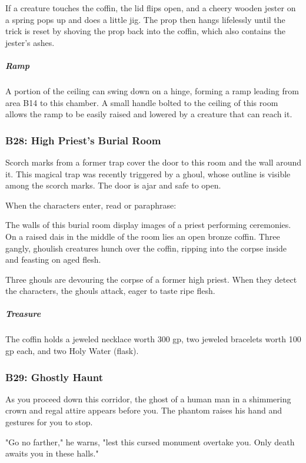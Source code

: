 \documentclass[10pt,a4paper,twoside,bg=print,twocolumn,openany,nodeprecatedcode]{dndbook}
\begin{document}
If a creature touches the coffin, the lid flips open, and a cheery wooden jester on a spring pops up and does a little jig. The prop then hangs lifelessly until the trick is reset by shoving the prop back into the coffin, which also contains the jester's ashes.

\subparagraph{Ramp}
A portion of the ceiling can swing down on a hinge, forming a ramp leading from area B14 to this chamber. A small handle bolted to the ceiling of this room allows the ramp to be easily raised and lowered by a creature that can reach it.

\subsubsection{B28: High Priest's Burial Room}
Scorch marks from a former trap cover the door to this room and the wall around it. This magical trap was recently triggered by a ghoul, whose outline is visible among the scorch marks. The door is ajar and safe to open.

When the characters enter, read or paraphrase:

\begin{DndReadAloud}{}
The walls of this burial room display images of a priest performing ceremonies. On a raised dais in the middle of the room lies an open bronze coffin. Three gangly, ghoulish creatures hunch over the coffin, ripping into the corpse inside and feasting on aged flesh.

\end{DndReadAloud}

Three ghouls are devouring the corpse of a former high priest. When they detect the characters, the ghouls attack, eager to taste ripe flesh.

\subparagraph{Treasure}
The coffin holds a jeweled necklace worth 300 gp, two jeweled bracelets worth 100 gp each, and two Holy Water (flask).

\subsubsection{B29: Ghostly Haunt}
\begin{DndReadAloud}{}
As you proceed down this corridor, the ghost of a human man in a shimmering crown and regal attire appears before you. The phantom raises his hand and gestures for you to stop.

"Go no farther," he warns, "lest this cursed monument overtake you. Only death awaits you in these halls."

\end{DndReadAloud}
\end{document}
